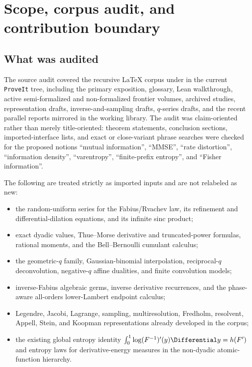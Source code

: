 \documentclass[11pt,oneside]{article}
\theoremstyle{definition}
\theoremstyle{remark}
\begin{document}
\tableofcontents
\newpage

\section{Scope, corpus audit, and contribution boundary}
\label{sec:scope}

\subsection{What was audited}

The source audit covered the recursive LaTeX corpus under
 in the current \texttt{ProveIt} tree, including
the primary exposition, glossary, Lean walkthrough, active semi-formalized and
non-formalized frontier volumes, archived studies, representation drafts,
inverse-and-sampling drafts, $q$-series drafts, and the recent parallel reports
mirrored in the working library.  The audit was claim-oriented rather than merely
title-oriented: theorem statements, conclusion sections, imported-interface
lists, and exact or close-variant phrase searches were checked for the proposed
notions ``mutual information'', ``MMSE'', ``rate distortion'', ``information
density'', ``varentropy'', ``finite-prefix entropy'', and ``Fisher information''.

The following are treated strictly as imported inputs and are not relabeled as
new:
\begin{itemize}
\item the random-uniform series for the Fabius/Rvachev law, its refinement and
      differential-dilation equations, and its infinite sinc product;
\item exact dyadic values, Thue--Morse derivative and truncated-power formulas,
      rational moments, and the Bell--Bernoulli cumulant calculus;
\item the geometric-$q$ family, Gaussian-binomial interpolation, reciprocal-$q$
      deconvolution, negative-$q$ affine dualities, and finite convolution models;
\item inverse-Fabius algebraic germs, inverse derivative recurrences, and the
      phase-aware all-orders lower-Lambert endpoint calculus;
\item Legendre, Jacobi, Lagrange, sampling, multiresolution, Fredholm, resolvent,
      Appell, Stein, and Koopman representations already developed in the corpus;
\item the existing global entropy identity
      $\int_0^1\log (F^{-1})'(y)\Differential y=h(F')$ and entropy laws for derivative-energy
      measures in the non-dyadic atomic-function hierarchy.
\end{itemize}
\end{document}
